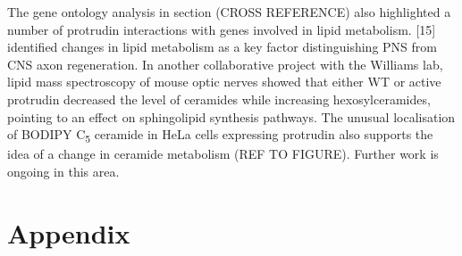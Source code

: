 \documentclass[
  12pt,
  a4paper,
]{book}
\begin{document}
The gene ontology analysis in section (CROSS REFERENCE) also highlighted a number of protrudin interactions with genes involved in lipid metabolism. {[}15{]} identified changes in lipid metabolism as a key factor distinguishing PNS from CNS axon regeneration. In another collaborative project with the Williams lab, lipid mass spectroscopy of mouse optic nerves showed that either WT or active protrudin decreased the level of ceramides while increasing hexosylceramides, pointing to an effect on sphingolipid synthesis pathways. The unusual localisation of BODIPY C\textsubscript{5} ceramide in HeLa cells expressing protrudin also supports the idea of a change in ceramide metabolism (REF TO FIGURE). Further work is ongoing in this area.

\hypertarget{APPENDIX}{%
\chapter*{Appendix}\label{APPENDIX}}

\end{document}
